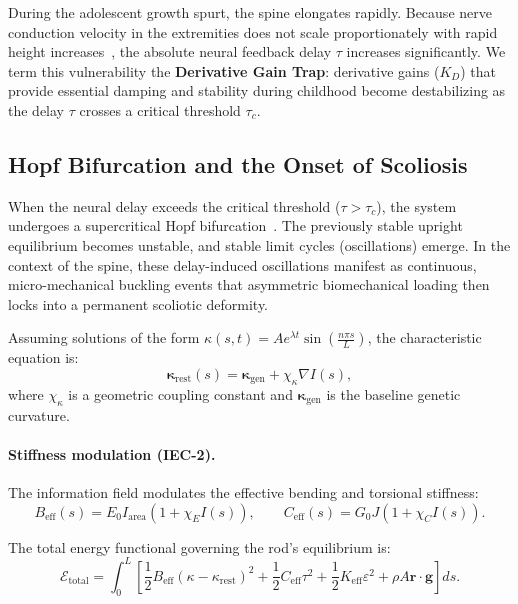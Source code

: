 During the adolescent growth spurt, the spine elongates rapidly. Because nerve conduction velocity in the extremities does not scale proportionately with rapid height increases~\cite{lang1985nerve, robinson2001nerve}, the absolute neural feedback delay $\tau$ increases significantly. We term this vulnerability the \textbf{Derivative Gain Trap}: derivative gains ($K_D$) that provide essential damping and stability during childhood become destabilizing as the delay $\tau$ crosses a critical threshold $\tau_c$.

\subsection{Hopf Bifurcation and the Onset of Scoliosis}

When the neural delay exceeds the critical threshold ($\tau > \tau_c$), the system undergoes a supercritical Hopf bifurcation~\cite{landry2005dynamics}. The previously stable upright equilibrium becomes unstable, and stable limit cycles (oscillations) emerge. In the context of the spine, these delay-induced oscillations manifest as continuous, micro-mechanical buckling events that asymmetric biomechanical loading then locks into a permanent scoliotic deformity.

Assuming solutions of the form $\kappa(s,t) = A e^{\lambda t} \sin\left(\frac{n\pi s}{L}\right)$, the characteristic equation is:
\begin{equation}
\boldsymbol{\kappa}_{\mathrm{rest}}(s) = \boldsymbol{\kappa}_{\mathrm{gen}} + \chi_\kappa \nabla I(s),
\label{eq:kappa_rest_iec}
\end{equation}
where $\chi_\kappa$ is a geometric coupling constant and $\boldsymbol{\kappa}_{\mathrm{gen}}$ is the baseline genetic curvature.

\paragraph{Stiffness modulation (IEC-2).}
The information field modulates the effective bending and torsional stiffness:
\begin{equation}
B_{\mathrm{eff}}(s) = E_0 I_{\mathrm{area}} (1 + \chi_E I(s)), \qquad
C_{\mathrm{eff}}(s) = G_0 J (1 + \chi_C I(s)).
\label{eq:stiffness_modulation}
\end{equation}

The total energy functional governing the rod's equilibrium is:
\begin{equation}
\mathcal{E}_{\mathrm{total}} = \int_0^L \left[ \frac{1}{2} B_{\mathrm{eff}}(\kappa - \kappa_{\mathrm{rest}})^2 + \frac{1}{2} C_{\mathrm{eff}} \tau^2 + \frac{1}{2} K_{\mathrm{eff}} \varepsilon^2 + \rho A \mathbf{r} \cdot \mathbf{g} \right] ds.
\label{eq:iec_energy}
\end{equation}

